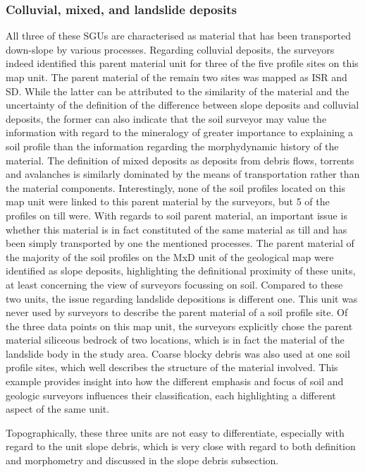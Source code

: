 \documentclass[preprint,12pt,authoryear]{elsarticle}
\begin{document}
\subsubsection{Colluvial, mixed, and landslide deposits}
All three of these SGUs are characterised as material that has been transported down-slope by various processes. Regarding colluvial deposits, the surveyors indeed identified this parent material unit for three of the five profile sites on this map unit. The parent material of the remain two sites was mapped as ISR and SD. While the latter can be attributed to the similarity of the material and the uncertainty of the definition of the difference between slope deposits and colluvial deposits, the former can also indicate that the soil surveyor may value the information with regard to the mineralogy of greater importance to explaining a soil profile  than the information regarding the morphydynamic history of the material. The definition of mixed deposits as deposits from debris flows, torrents and avalanches is similarly dominated by the means of transportation rather than the material components. Interestingly, none of the soil profiles located on this map unit were linked to this parent material by the surveyors, but 5 of the profiles on till were. With regards to soil parent material, an important issue is whether this material is in fact constituted of the same material as till and has been simply transported by one the mentioned processes. The parent material of the majority of the soil profiles on the  MxD unit of the geological map were identified as slope deposits, highlighting the definitional proximity of these units, at least concerning the view of surveyors focussing on soil. Compared to these two units, the issue regarding landslide depositions is different one. This unit was never used by surveyors to describe the parent material of a soil profile site. Of the three data points on this map unit, the surveyors explicitly chose the parent material siliceous bedrock of two locations, which is in fact the material of the landslide body in the study area. Coarse blocky debris was also used at one soil profile sites, which well describes the  structure of the material involved. This example provides insight into how the different emphasis and focus of soil and geologic surveyors influences their classification, each highlighting a different aspect of the same unit.

Topographically, these three units are not easy to differentiate, especially with regard to the unit slope debris, which is very close with regard to both definition and morphometry and discussed in the slope debris subsection.
\end{document}
